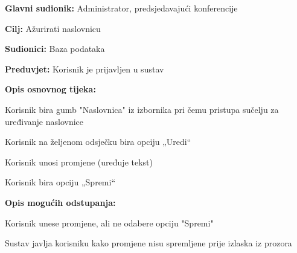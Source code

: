					\noindent {}
					\begin{packed_item}
						\item \textbf{Glavni sudionik:} Administrator, predsjedavajući konferencije
						\item \textbf{Cilj:} Ažurirati naslovnicu
						\item \textbf{Sudionici:} Baza podataka
						\item \textbf{Preduvjet:} Korisnik je prijavljen u sustav
						
						\item \textbf{Opis osnovnog tijeka:} 
						\item[] \begin{packed_enum}
							\item Korisnik bira gumb "Naslovnica" iz izbornika pri čemu pristupa sučelju za uređivanje naslovnice
							\item Korisnik na željenom odsječku bira opciju „Uredi“
							\item Korisnik unosi promjene (uređuje tekst)
							\item Korisnik bira opciju „Spremi“
						\end{packed_enum}
					
						\item \textbf{Opis mogućih odstupanja:}
						\item[] \begin{packed_enum}

							\item[3.a] Korisnik unese promjene, ali ne odabere opciju "Spremi"
							\item[] \begin{packed_enum}
								\item[1.] Sustav javlja korisniku kako promjene nisu spremljene prije izlaska iz prozora
							\end{packed_enum}
							
						\end{packed_enum}
					\end{packed_item}

